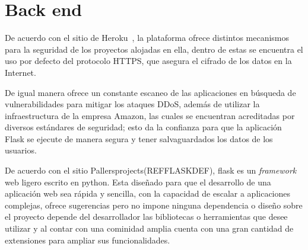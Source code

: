 \section{Back end}


De acuerdo con el sitio de Heroku~\cite{heroku_heroku_2020}, la plataforma ofrece distintos mecanismos para la seguridad de los proyectos alojadas en ella, dentro de estas se encuentra el uso por defecto del protocolo HTTPS, que asegura el cifrado de los datos en la Internet.

De igual manera ofrece un constante escaneo de las aplicaciones en búsqueda de vulnerabilidades para mitigar los ataques DDoS, además de utilizar la infraestructura de la empresa Amazon, las cuales se encuentran acreditadas por diversos estándares de seguridad; esto da la confianza para que la aplicación Flask se ejecute de manera segura y tener salvaguardados los datos de los usuarios.

De acuerdo con el sitio Pallersprojects(REFFLASKDEF), flask es un \textit{framework} web ligero escrito en python. Esta diseñado para que el desarrollo de una aplicación web sea rápida y sencilla, con la capacidad de escalar a aplicaciones complejas, ofrece sugerencias pero no impone ninguna dependencia o diseño sobre el proyecto depende del desarrollador las bibliotecas o herramientas que desee utilizar y al contar con una cominidad amplia cuenta con una gran cantidad de extensiones para ampliar sus funcionalidades.